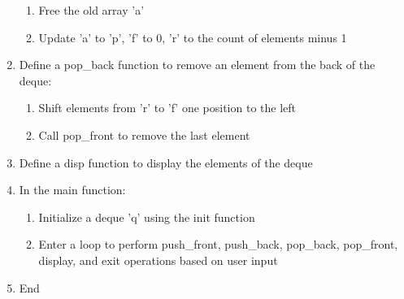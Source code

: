 \documentclass{article}
\begin{document}
\begin{enumerate}
\begin{enumerate}
      \item Free the old array 'a'
      \item Update 'a' to 'p', 'f' to 0, 'r' to the count of elements minus 1
    \end{enumerate}
  \item Define a pop\_back function to remove an element from the back of the deque:
    \begin{enumerate}
      \item Shift elements from 'r' to 'f' one position to the left
      \item Call pop\_front to remove the last element
    \end{enumerate}
  \item Define a disp function to display the elements of the deque
  \item In the main function:
    \begin{enumerate}
      \item Initialize a deque 'q' using the init function
      \item Enter a loop to perform push\_front, push\_back, pop\_back, pop\_front, display, and exit operations based on user input
    \end{enumerate}
  \item End
\end{enumerate}
\end{document}
